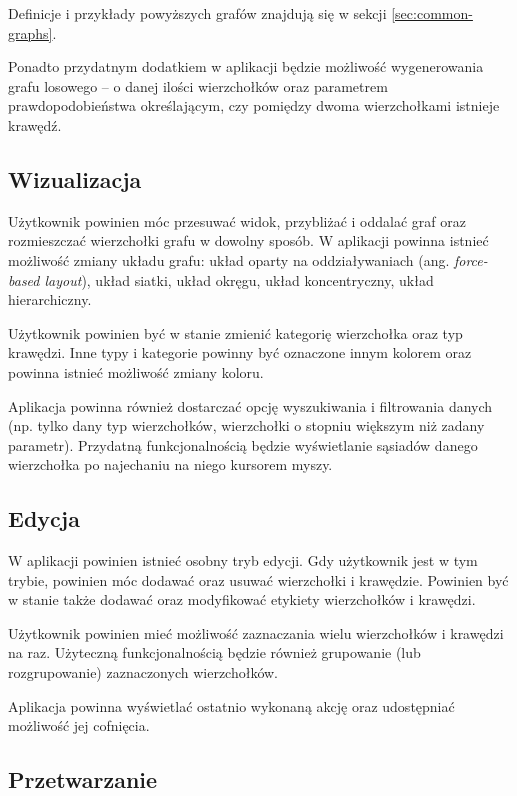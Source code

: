 Definicje i przykłady powyższych grafów znajdują się w sekcji \ref{sec:common-graphs}.

Ponadto przydatnym dodatkiem w aplikacji będzie możliwość wygenerowania grafu losowego -- o danej ilości wierzchołków oraz parametrem prawdopodobieństwa określającym, czy pomiędzy dwoma wierzchołkami istnieje krawędź.  

\subsection{Wizualizacja}

Użytkownik powinien móc przesuwać widok, przybliżać i oddalać graf oraz rozmieszczać wierzchołki grafu w dowolny sposób. W aplikacji powinna istnieć możliwość zmiany układu grafu: układ oparty na oddziaływaniach (ang. \textit{force-based layout}), układ siatki, układ okręgu, układ koncentryczny, układ hierarchiczny. 

Użytkownik powinien być w stanie zmienić kategorię wierzchołka oraz typ krawędzi. Inne typy i kategorie powinny być oznaczone innym kolorem oraz powinna istnieć możliwość zmiany koloru. 

Aplikacja powinna również dostarczać opcję wyszukiwania i filtrowania danych (np. tylko dany typ wierzchołków, wierzchołki o stopniu większym niż zadany parametr). Przydatną funkcjonalnością będzie wyświetlanie sąsiadów danego wierzchołka po najechaniu na niego kursorem myszy.

\subsection{Edycja}

W aplikacji powinien istnieć osobny tryb edycji. Gdy użytkownik jest w tym trybie, powinien móc dodawać oraz usuwać wierzchołki i krawędzie. Powinien być w stanie także dodawać oraz modyfikować etykiety wierzchołków i krawędzi.

Użytkownik powinien mieć możliwość zaznaczania wielu wierzchołków i krawędzi na raz. Użyteczną funkcjonalnością będzie również grupowanie (lub rozgrupowanie) zaznaczonych wierzchołków. 

Aplikacja powinna wyświetlać ostatnio wykonaną akcję oraz udostępniać możliwość jej cofnięcia.

\subsection{Przetwarzanie}

